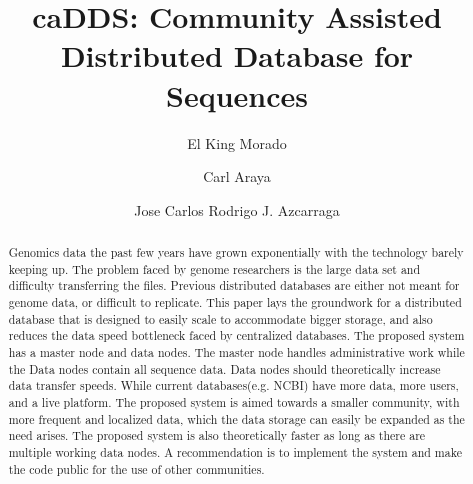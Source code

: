 \documentclass[acmsmall]{acmart}
\begin{document}
\title{caDDS: Community Assisted Distributed Database for Sequences}

\author{El King Morado}

\author{Carl Araya}

\author{Jose Carlos Rodrigo J. Azcarraga}


\renewcommand{\shortauthors}{Araya and Azcarraga}

\begin{abstract}
Genomics data the past few years have grown exponentially with the technology barely keeping up. The problem faced by genome researchers is the large data set and difficulty transferring the files. Previous distributed databases are either not meant for genome data, or difficult to replicate. This paper lays the groundwork for a distributed database that is designed to easily scale to accommodate bigger storage, and also reduces the data speed bottleneck faced by centralized databases. The proposed system has a master node and data nodes. The master node handles administrative work while the Data nodes contain all sequence data. Data nodes should theoretically increase data transfer speeds. While current databases(e.g. NCBI) have more data, more users, and a live platform. The proposed system is aimed towards a smaller community, with more frequent and localized data, which the data storage can easily be expanded as the need arises. The proposed system is also theoretically faster as long as there are multiple working data nodes. A recommendation is to implement the system and make the code public for the use of other communities.
\end{abstract}
\end{document}
